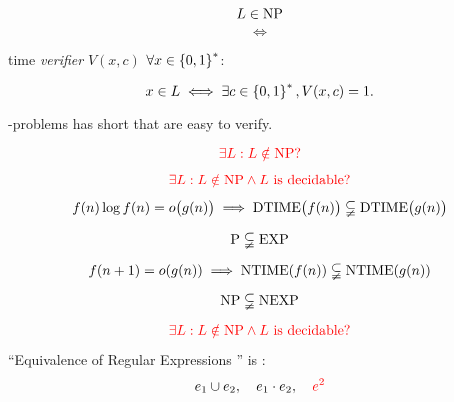 
\begin{frame}
  \begin{definition}[\np]
	\[
	  L \in \text{NP}
	\]
	\[
	  \iff
	\]
	\begin{center}
	  \red{$\exists$}  time \emph{verifier} $V(x,c)$  $\forall x \in \left\{ 0,1 \right\}^{\ast}$:
	\end{center}
	\[
	  x \in L \iff \exists c \in \left\{ 0,1 \right\}^{\ast}, V(x,c) = 1.
	\]
  \end{definition}

  \vspace{0.50cm}
  \begin{center}
	{\large \np-problems has short  that are easy to verify.}
  \end{center}
\end{frame}

\begin{frame}
  \[
	\textcolor{red}{\exists L: L \notin \text{NP}?}
  \]

  \pause
\end{frame}

\begin{frame}
  \[
	\textcolor{red}{\exists L: L \notin \text{NP} \land L \text{ is decidable}?}
  \]

  \begin{theorem}
	\[
	  f(n) \log f(n) = o\big(g(n)\big) \implies \text{DTIME}\big(f(n)\big) \subsetneqq \text{DTIME}\big(g(n)\big)
	\]
  \end{theorem}

  \pause
  \[
	\text{P} \subsetneqq \text{EXP}
  \]

  \begin{theorem}
	\[
	  f(n + 1) = o(g(n)) \implies \text{NTIME}(f(n)) \subsetneqq \text{NTIME}(g(n))
	\]
  \end{theorem}

  \pause
  \[
	\text{NP} \subsetneqq \text{NEXP}
  \]
\end{frame}

\begin{frame}
  \[
	\textcolor{red}{\exists L: L \notin \text{NP} \land L \text{ is decidable}?}
  \]

  \pause
  \vspace{0.50cm}
  \begin{exampleblock}{``Equivalence of Regular Expressions '' is \nexpc:}
	\[
	  e_1 \cup e_2,\quad e_1 \cdot e_2,\quad \textcolor{red}{e^{2}}
	\]
  \end{exampleblock}
\end{frame}

